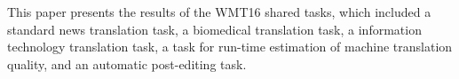 This paper presents the results of the WMT16 shared tasks, which included a standard news translation task, a biomedical translation task, a information technology translation task, a task for run-time estimation of machine translation quality, and an automatic post-editing task.
